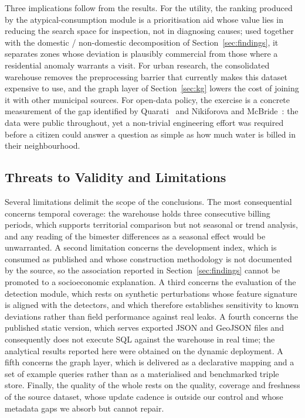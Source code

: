 \documentclass[runningheads]{llncs}
\renewcommand{\_}{\origunderscore\allowbreak}
\newif\ifshowchanges
\newenvironment{chgblock}{\ifshowchanges\color{chg}\fi}{}
\begin{document}
\begin{chgblock}
Three implications follow from the results. For the utility, the ranking produced
by the atypical-consumption module is a prioritisation aid whose value lies in
reducing the search space for inspection, not in diagnosing causes; used together
with the domestic / non-domestic decomposition of Section~\ref{sec:findings}, it
separates zones whose deviation is plausibly commercial from those where a
residential anomaly warrants a visit. For urban research, the consolidated
warehouse removes the preprocessing barrier that currently makes this dataset
expensive to use, and the graph layer of Section~\ref{sec:kg} lowers the cost of
joining it with other municipal sources. For open-data policy, the exercise is a
concrete measurement of the gap identified by
Quarati~\cite{quarati2023} and Nikiforova and McBride~\cite{nikiforova2021}: the
data were public throughout, yet a non-trivial engineering effort was required
before a citizen could answer a question as simple as how much water is billed in
their neighbourhood.

\subsection{Threats to Validity and Limitations}
\label{sec:limits}

Several limitations delimit the scope of the conclusions. The most consequential
concerns temporal coverage: the warehouse holds three consecutive billing
periods, which supports territorial comparison but not seasonal or trend
analysis, and any reading of the bimester differences as a seasonal effect would
be unwarranted. A second limitation concerns the development index, which is
consumed as published and whose construction methodology is not documented by the
source, so the association reported in Section~\ref{sec:findings} cannot be
promoted to a socioeconomic explanation. A third concerns the evaluation of the
detection module, which rests on synthetic perturbations whose feature signature
is aligned with the detectors, and which therefore establishes sensitivity to
known deviations rather than field performance against real leaks. A fourth
concerns the published static version, which serves exported JSON and GeoJSON
files and consequently does not execute SQL against the warehouse in real time;
the analytical results reported here were obtained on the dynamic deployment. A
fifth concerns the graph layer, which is delivered as a declarative mapping and a
set of example queries rather than as a materialised and benchmarked triple
store. Finally, the quality of the whole rests on the quality, coverage and
freshness of the source dataset, whose update cadence is outside our control and
whose metadata gaps we absorb but cannot repair.
\end{chgblock}
\end{document}
